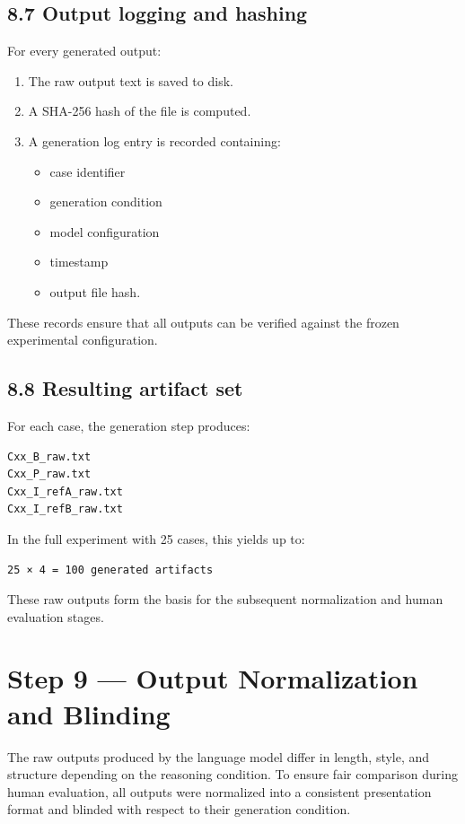 {\subsection*{8.7 Output logging and hashing}

For every generated output:

\begin{enumerate}
\item The raw output text is saved to disk.
\item A SHA-256 hash of the file is computed.
\item A generation log entry is recorded containing:
\begin{itemize}
\item case identifier
\item generation condition
\item model configuration
\item timestamp
\item output file hash.
\end{itemize}
\end{enumerate}

These records ensure that all outputs can be verified against the frozen experimental configuration.

\subsection*{8.8 Resulting artifact set}

For each case, the generation step produces:

\begin{verbatim}
Cxx_B_raw.txt
Cxx_P_raw.txt
Cxx_I_refA_raw.txt
Cxx_I_refB_raw.txt
\end{verbatim}

In the full experiment with 25 cases, this yields up to:

\begin{verbatim}
25 × 4 = 100 generated artifacts
\end{verbatim}

These raw outputs form the basis for the subsequent normalization and human evaluation stages.

\section*{Step 9 — Output Normalization and Blinding}

The raw outputs produced by the language model differ in length, style, and structure depending on the reasoning condition. To ensure fair comparison during human evaluation, all outputs were normalized into a consistent presentation format and blinded with respect to their generation condition.

}
